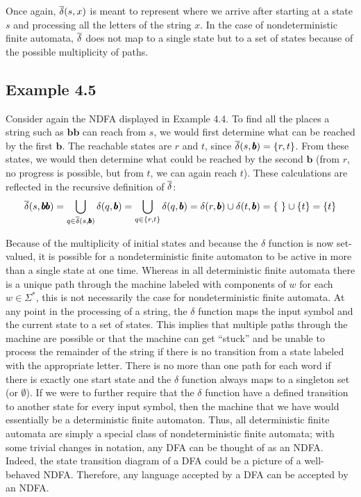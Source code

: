 Once again, $\overline{\delta}(s,x)$ is meant to represent where we arrive after starting at
a state $s$ and processing all the letters of the string $x$. In the case of
nondeterministic finite automata, $\overline{\delta}$ does not map to a single state but to
a set of states because of the possible multiplicity of paths.

\subsection*{Example 4.5}

Consider again the NDFA displayed in Example 4.4. To find all the places a
string such as $\pmb{bb}$ can reach from $s$, we would first determine what can be
reached by the first $\pmb{b}$. The reachable states are $r$ and $t$, since
$\overline{\delta}(s,\pmb{b}) = \{r, t\}$. From these states, we would then determine what
could be reached by the second $\pmb{b}$ (from $r$, no progress is possible, but
from $t$, we can again reach $t$). These calculations are reflected in the
recursive definition of $\overline{\delta}$:
\[ \overline{\delta}(s,\pmb{bb}) = \bigcup\limits_{q\in \overline{\delta}(s,\pmb{b})}\delta
	(q,\pmb{b}) = \bigcup\limits_{q\in \{r,t\}}\delta(q,\pmb{b}) =
	\delta(r,\pmb{b}) \cup \delta(t,\pmb{b}) = \{\ \} \cup \{t\} = \{t\} \]

Because of the multiplicity of initial states and because the $\delta$ function
is now set-valued, it is possible for a nondeterministic finite automaton to be
active in more than a single state at one time. Whereas in all deterministic
finite automata there is a unique path through the machine labeled with
components of $w$ for each $w \in \Sigma^*$, this is not necessarily the case
for nondeterministic finite automata. At any point in the processing of a
string, the $\delta$ function maps the input symbol and the current state to a
set of states. This implies that multiple paths through the machine are possible
or that the machine can get ``stuck'' and be unable to process the remainder of
the string if there is no transition from a state labeled with the appropriate
letter. There is no more than one path for each word if there is exactly one
start state and the $\delta$ function always maps to a singleton set (or
$\emptyset$). If we were to further require that the $\delta$ function have a
defined transition to another state for every input symbol, then the machine
that we have would essentially be a deterministic finite automaton. Thus, all
deterministic finite automata are simply a special class of nondeterministic
finite automata; with some trivial changes in notation, any DFA can be thought
of as an NDFA. Indeed, the state transition diagram of a DFA could be a picture
of a well-behaved NDFA. Therefore, any language accepted by a DFA can be
accepted by an NDFA.

